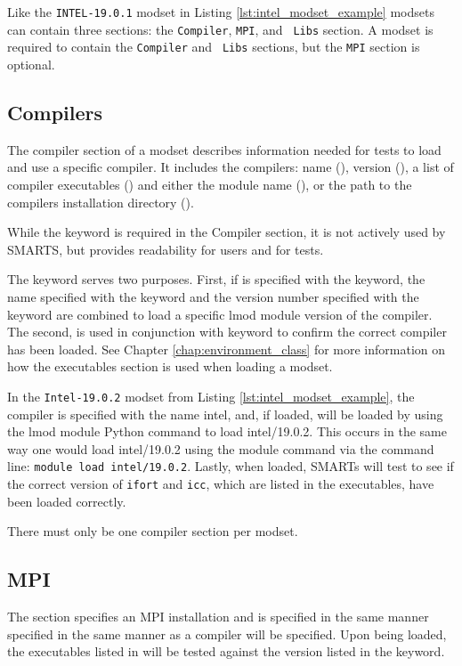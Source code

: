Like the {\tt INTEL-19.0.1} modset in Listing \ref{lst:intel_modset_example}
modsets can contain three sections: the {\tt Compiler}, {\tt MPI}, and {\tt
Libs} section.  A modset is required to contain the {\tt Compiler} and {\tt
Libs} sections, but the {\tt MPI} section is optional.

\subsection{Compilers}
\label{subsec:modset_compilers}

The compiler section of a modset describes information needed for tests to load
and use a specific compiler. It includes the compilers: name (\name),
version (\version), a list of compiler executables (\executables) and
either the module name (\module), or the path to the compilers
installation directory (\pathname).

While the \name keyword is required in the Compiler section, it is not actively 
used by SMARTS, but provides readability for users and for tests.

The \version keyword serves two purposes. First, if \version is specified with
the \module keyword, the name specified with the \module keyword and the
version number specified with the \version keyword are combined to load a
specific lmod module version of the compiler. The second, \version is used in
conjunction with \executables keyword to confirm the correct compiler has been
loaded. See Chapter \ref{chap:environment_class} for more information on how
the executables section is used when loading a modset.

In the {\tt Intel-19.0.2} modset from Listing \ref{lst:intel_modset_example},
the compiler is specified with the name intel, and, if loaded, will be loaded
by using the lmod module Python command to load intel/19.0.2. This occurs in
the same way one would load intel/19.0.2 using the module command via the
command line: {\tt module load intel/19.0.2}. Lastly, when loaded, SMARTs will
test to see if the correct version of {\tt ifort} and {\tt icc}, which are
listed in the executables, have been loaded correctly.

There must only be one compiler section per modset.

\subsection{MPI}
\label{subsec:modset_mpi}

The \mpi section specifies an MPI installation and is specified in the same
manner specified in the same manner as a compiler will be specified. Upon being
loaded, the executables listed in \executables will be tested against the
version listed in the \version keyword.

